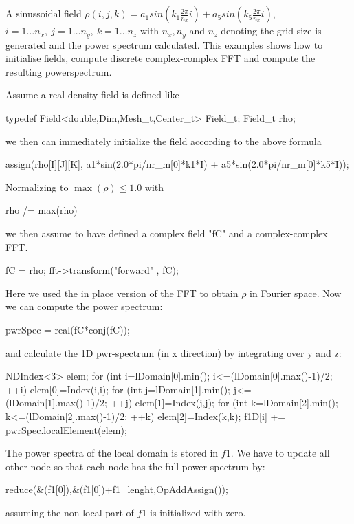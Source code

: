 \section{}
A sinussoidal field  $\rho(i,j,k) = a_1sin(k_1 \frac{2\pi}{n_x} i) + a_5 sin(k_5 \frac{2\pi}{n_x} i)$,
$i= 1 \dots n_x, ~ j= 1 \dots n_y, ~ k= 1 \dots n_z $ with $n_x,n_y$ and $n_z$ denoting the grid size is generated and
the power spectrum calculated. This examples shows how to initialise fields, compute discrete complex-complex FFT and
compute the resulting powerspectrum.

Assume a real density field is defined like
\begin{smallcode}
typedef Field<double,Dim,Mesh_t,Center_t>  Field_t;
Field_t rho;
\end{smallcode}
we then can immediately initialize the field according to the above formula
\begin{smallcode}
assign(rho[I][J][K], a1*sin(2.0*pi/nr_m[0]*k1*I) +
                     a5*sin(2.0*pi/nr_m[0]*k5*I));
\end{smallcode}
Normalizing to $\max(\rho) \le 1.0 $ with
\begin{smallcode}
rho /= max(rho)
\end{smallcode}
we then assume to have defined a complex field "fC" and a complex-complex FFT.
\begin{smallcode}
fC = rho;
fft->transform("forward" , fC);
 \end{smallcode}
Here we used the in place version of the FFT to obtain $\rho $ in Fourier space. Now
we can compute the power spectrum:
\begin{smallcode}
pwrSpec = real(fC*conj(fC));
\end{smallcode}
and calculate the 1D pwr-spectrum (in x direction) by integrating over y and z: \\
\begin{code}
 NDIndex<3> elem;
 for (int i=lDomain[0].min(); i<=(lDomain[0].max()-1)/2; ++i) {
  elem[0]=Index(i,i);
   for (int j=lDomain[1].min(); j<=(lDomain[1].max()-1)/2; ++j) {
    elem[1]=Index(j,j);
     for (int k=lDomain[2].min(); k<=(lDomain[2].max()-1)/2; ++k) {
       elem[2]=Index(k,k);
       f1D[i] += pwrSpec.localElement(elem);
     }
   }
 }
\end{code}
The power spectra of the local domain is stored in $f1$. We have to update all other node
so that each node has the full power spectrum by:
\begin{smallcode}
reduce(&(f1[0]),&(f1[0])+f1_lenght,OpAddAssign());
\end{smallcode}
assuming the non local part of $f1$ is initialized with zero.

